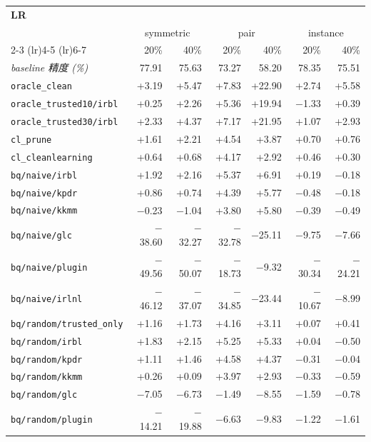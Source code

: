 \begin{tabular}{lrrrrrr}
\toprule
\multicolumn{7}{l}{\textbf{LR}} \\
 & \multicolumn{2}{c}{symmetric} & \multicolumn{2}{c}{pair} & \multicolumn{2}{c}{instance} \\
\cmidrule(lr){2-3} \cmidrule(lr){4-5} \cmidrule(lr){6-7}
 & 20\% & 40\% & 20\% & 40\% & 20\% & 40\% \\
\midrule
\textit{baseline 精度 (\%)} & 77.91 & 75.63 & 73.27 & 58.20 & 78.35 & 75.51 \\
\addlinespace
\texttt{oracle\_clean} & +3.19 & +5.47 & +7.83 & +22.90 & +2.74 & +5.58 \\
\texttt{oracle\_trusted10/irbl} & +0.25 & +2.26 & +5.36 & +19.94 & $-$1.33 & +0.39 \\
\texttt{oracle\_trusted30/irbl} & +2.33 & +4.37 & +7.17 & +21.95 & +1.07 & +2.93 \\
\texttt{cl\_prune} & +1.61 & +2.21 & +4.54 & +3.87 & +0.70 & +0.76 \\
\texttt{cl\_cleanlearning} & +0.64 & +0.68 & +4.17 & +2.92 & +0.46 & +0.30 \\
\texttt{bq/naive/irbl} & +1.92 & +2.16 & +5.37 & +6.91 & +0.19 & $-$0.18 \\
\texttt{bq/naive/kpdr} & +0.86 & +0.74 & +4.39 & +5.77 & $-$0.48 & $-$0.18 \\
\texttt{bq/naive/kkmm} & $-$0.23 & $-$1.04 & +3.80 & +5.80 & $-$0.39 & $-$0.49 \\
\texttt{bq/naive/glc} & $-$38.60 & $-$32.27 & $-$32.78 & $-$25.11 & $-$9.75 & $-$7.66 \\
\texttt{bq/naive/plugin} & $-$49.56 & $-$50.07 & $-$18.73 & $-$9.32 & $-$30.34 & $-$24.21 \\
\texttt{bq/naive/irlnl} & $-$46.12 & $-$37.07 & $-$34.85 & $-$23.44 & $-$10.67 & $-$8.99 \\
\texttt{bq/random/trusted\_only} & +1.16 & +1.73 & +4.16 & +3.11 & +0.07 & +0.41 \\
\texttt{bq/random/irbl} & +1.83 & +2.15 & +5.25 & +5.33 & +0.04 & $-$0.50 \\
\texttt{bq/random/kpdr} & +1.11 & +1.46 & +4.58 & +4.37 & $-$0.31 & $-$0.04 \\
\texttt{bq/random/kkmm} & +0.26 & +0.09 & +3.97 & +2.93 & $-$0.33 & $-$0.59 \\
\texttt{bq/random/glc} & $-$7.05 & $-$6.73 & $-$1.49 & $-$8.55 & $-$1.59 & $-$0.78 \\
\texttt{bq/random/plugin} & $-$14.21 & $-$19.88 & $-$6.63 & $-$9.83 & $-$1.22 & $-$1.61 \\

\end{tabular}

